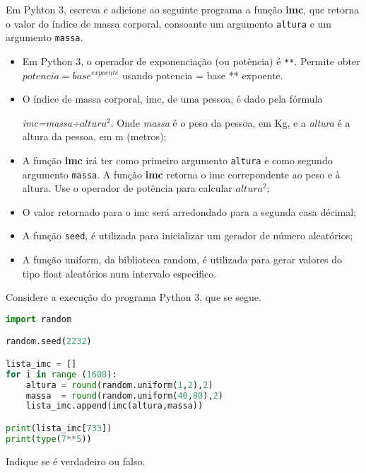 \documentclass[12pt,varwidth=16cm,border=17pt]{standalone}
\begin{document}
Em Pyhton 3, escreva e adicione ao seguinte programa a função \textbf{imc}, que retorna o valor do índice de massa corporal, consoante um argumento \verb+altura+ e um argumento \verb+massa+.
\begin{itemize}
    
  \item Em Python 3, o operador de exponenciação (ou potência) é \verb+**+. Permite obter $potencia=base^{expoente}$ usando potencia = base ** expoente.
  
  
  
  \item  O índice de massa corporal, imc, de uma pessoa, é dado pela fórmula

  \emph{imc=massa÷$altura^2$}. Onde \emph{massa} é o peso da pessoa, em Kg, e a \emph{altura} é a altura da pessoa, em m (metros);
  \item A função \textbf{imc} irá ter como primeiro argumento \verb+altura+ e como segundo argumento \verb+massa+. A função \textbf{imc} retorna o imc correpondente ao peso e à altura. Use o operador de potência para calcular $altura^2$;
  \item O valor retornado para o imc será arredondado para a segunda casa décimal;
  \item A função \verb+seed+, é utilizada para inicializar um gerador de número aleatórios;
  \item A função uniform, da biblioteca random, é utilizada para gerar valores do tipo float aleatórios num intervalo especifico.
  
  

    
\end{itemize}




Considere a execução do programa Python 3, que se segue. 

\begin{lstlisting}[language=Python]
import random

random.seed(2232)

lista_imc = []
for i in range (1608):
    altura = round(random.uniform(1,2),2)
    massa  = round(random.uniform(40,80),2)
    lista_imc.append(imc(altura,massa))

print(lista_imc[733])
print(type(7**5))
\end{lstlisting}

Indique se é verdadeiro ou falso.
\end{document}
